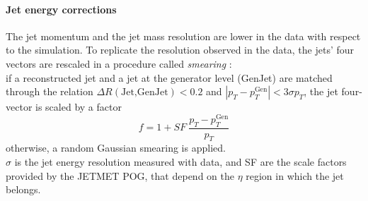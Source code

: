 \paragraph*{Jet energy corrections}
The jet momentum and the jet mass resolution are lower in the data with respect to the simulation. To replicate the resolution observed in the data, the jets' four vectors are rescaled in a procedure called \emph{smearing} \cite{2021Jet13TeV}:\\
if a reconstructed jet and a jet at the generator level (GenJet) are matched through the relation $\Delta R(\text{Jet,GenJet})<0.2$ and $|p_T-p_T^{\text{Gen}}|<3\sigma p_T$, the jet four-vector is scaled by a factor
\begin{equation}
    f=1+\textit{SF}\:\frac{p_T-p_T^{\text{Gen}}}{p_T}
\end{equation}
otherwise, a random Gaussian smearing is applied.\\
$\sigma$ is the jet energy resolution measured with data, and SF are the scale factors provided by the JETMET POG, that depend on the $\eta$ region in which the jet belongs.

